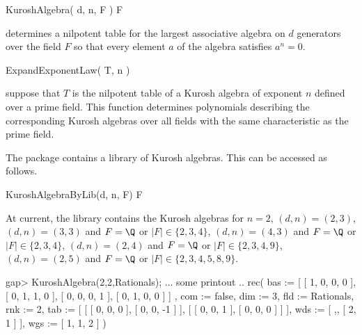 \> KuroshAlgebra( d, n, F ) F

determines a nilpotent table for the largest associative algebra on
$d$ generators over the field $F$ so that every element $a$ of the 
algebra satisfies $a^n = 0$.

\> ExpandExponentLaw( T, n )

suppose that $T$ is the nilpotent table of a Kurosh algebra of exponent
$n$ defined over a prime field. This function determines polynomials 
describing the corresponding Kurosh algebras over all fields with the same 
characteristic as the prime field.


The package contains a library of Kurosh algebras. This can be accessed
as follows.

\> KuroshAlgebraByLib(d, n, F) F

At current, the library contains the Kurosh algebras for 
$n=2$, 
$(d,n) = (2,3)$, 
$(d,n) = (3,3)$ and $F = \Q$ or $|F| \in \{2,3,4\}$,
$(d,n) = (4,3)$ and $F = \Q$ or $|F| \in \{2,3,4\}$,
$(d,n) = (2,4)$ and $F = \Q$ or $|F| \in \{2,3,4,9\}$,
$(d,n) = (2,5)$ and $F = \Q$ or $|F| \in \{2,3,4,5,8,9\}$.


\beginexample
gap> KuroshAlgebra(2,2,Rationals);
... some printout ..
rec( bas := [ [ 1, 0, 0, 0 ], [ 0, 1, 1, 0 ], [ 0, 0, 0, 1 ], [ 0, 1, 0, 0 ] ]
    , com := false, dim := 3, fld := Rationals, rnk := 2, 
  tab := [ [ [ 0, 0, 0 ], [ 0, 0, -1 ] ], [ [ 0, 0, 1 ], [ 0, 0, 0 ] ] ], 
  wds := [ ,, [ 2, 1 ] ], wgs := [ 1, 1, 2 ] )
\endexample


